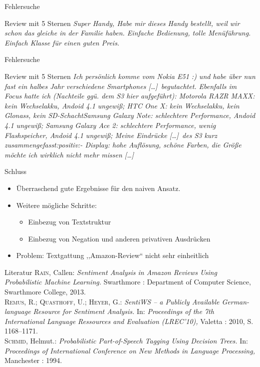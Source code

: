 \documentclass[note=hide]{beamer} %
\newcommand{\ellipse}{[\ldots]}
\begin{document}
\begin{frame}{Fehlersuche}
	\begin{block}{Review mit 5 Sternen}
		\it
		Super Handy, Habe mir dieses Handy bestellt, weil wir schon das gleiche in der Familie haben. Einfache Bedienung, tolle Menüführung. Einfach Klasse für einen guten Preis.
	\end{block}
\end{frame}

\begin{frame}{Fehlersuche}
	\begin{block}{Review mit 5 Sternen}
		\it
	Ich persönlich komme vom Nokia E51 :) und habe über nun fast ein halbes Jahr verschiedene Smartphones \ellipse\ begutachtet. Ebenfalls im Focus hatte ich (Nachteile ggü. dem S3 hier aufgeführt): Motorola RAZR MAXX: kein Wechselakku, Andoid 4.1 ungewiß; HTC One X: kein Wechselakku, kein Glonass, kein SD-SchachtSamsung Galaxy Note: schlechtere Performance, Andoid 4.1 ungewiß; Samsung Galaxy Ace 2: schlechtere Performance, wenig Flashspeicher, Andoid 4.1 ungewiß; Meine Eindrücke \ellipse\ des S3 kurz zusammengefasst:positiv:- Display: hohe Auflösung, schöne Farben, die Größe möchte ich wirklich nicht mehr missen \ellipse
	\end{block}
\end{frame}

\begin{frame}{Schluss}

	\begin{itemize}
		\item Überraschend gute Ergebnisse für den naiven Ansatz.
		\item Weitere mögliche Schritte:
			\begin{itemize}
				\item Einbezug von Textstruktur
				\item Einbezug von Negation und anderen privativen Ausdrücken
			\end{itemize}
		\item Problem: Textgattung ,,Amazon-Review`` nicht sehr einheitlich
	\end{itemize}
\end{frame}

\begin{frame}{Literatur}
	\small
	\textsc{Rain,} Callen: \textit{Sentiment Analysis in Amazon Reviews Using Probabilistic Machine Learning.} Swarthmore : Department of Computer Science, Swarthmore College, 2013.\\[0.3cm]

	\textsc{Remus,} R.; \textsc{Quasthoff,} U.; \textsc{Heyer,} G.: \textit{SentiWS -- a Publicly Available German-language Resource for Sentiment Analysis.} In: \textit{Proceedings of the 7th International Language Ressources and Evaluation (LREC'10),} Valetta : 2010, S. 1168--1171.\\[0.3cm]

	\textsc{Schmid,} Helmut.: \textit{Probabilistic Part-of-Speech Tagging Using Decision Trees.} In: \textit{Proceedings of International Conference on New Methods in Language Processing,} Manchester : 1994.
\end{frame}
\end{document}
